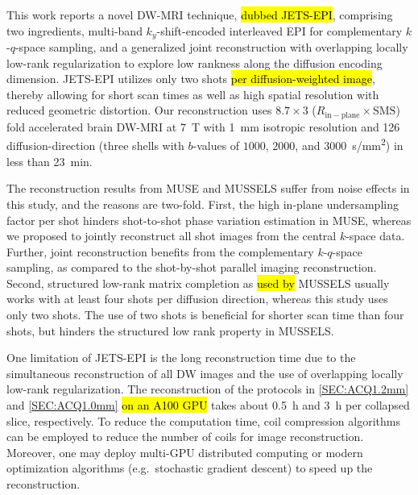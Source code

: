 \documentclass[preprint,12pt,authoryear,review]{elsarticle}
\begin{document}
    This work reports a novel DW-MRI technique, \hl{dubbed JETS-EPI}, 
    comprising two ingredients,
    multi-band $k_y$-shift-encoded interleaved EPI
    for complementary $k$-$q$-space sampling, and
    a generalized joint reconstruction
    with overlapping locally low-rank regularization
    to explore low rankness along the diffusion encoding dimension.
    JETS-EPI utilizes only two shots \hl{per diffusion-weighted image}, 
    thereby allowing for short scan times
    as well as high spatial resolution with reduced geometric distortion.
    Our reconstruction uses $8.7 \times 3$ ($R_\mathrm{in-plane} \times \mathrm{SMS}$)
    fold accelerated brain DW-MRI at \SI{7}{\tesla}
    with \SI{1}{mm} isotropic resolution
    and 126 diffusion-direction (three shells with
    $b$-values of $1000$, $2000$, and \SI{3000}{s/mm^2})
    in less than \SI{23}{min}.

    The reconstruction results from MUSE and MUSSELS
    suffer from noise effects in this study,
    and the reasons are two-fold.
    First, the high in-plane undersampling factor per shot
    hinders shot-to-shot phase variation estimation in MUSE,
    whereas we proposed to jointly reconstruct all shot images from the central $k$-space data.
    Further, joint reconstruction benefits from the complementary $k$-$q$-space sampling,
    as compared to the shot-by-shot parallel imaging reconstruction.
    Second, structured low-rank matrix completion as \hl{used by} MUSSELS usually 
    works with at least four shots per diffusion direction,
    whereas this study uses only two shots.
    The use of two shots is beneficial for shorter scan time than four shots,
    but hinders the structured low rank property in MUSSELS.

    One limitation of JETS-EPI is the long reconstruction time
    due to the simultaneous reconstruction of all DW images and
    the use of overlapping locally low-rank regularization.
    The reconstruction of the protocols in \cref{SEC:ACQ1.2mm} and \cref{SEC:ACQ1.0mm} 
    \hl{on an A100 GPU} takes about \SI{0.5}{\hour} and \SI{3}{\hour} per collapsed slice, respectively.
    To reduce the computation time, coil compression algorithms \citep{huang_2008_scc}
    can be employed to reduce the number of coils for image reconstruction.
    Moreover, one may deploy multi-GPU distributed computing or modern optimization algorithms
    (e.g.~stochastic gradient descent) \citep{ong_2020_extreme} to speed up the reconstruction.
\end{document}
